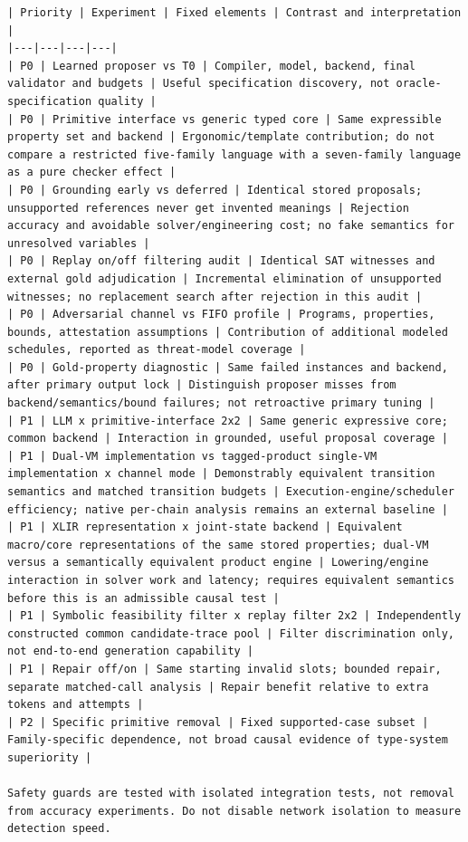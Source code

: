 \documentclass[11pt,a4paper]{article}
\begin{document}
\begin{verbatim}
| Priority | Experiment | Fixed elements | Contrast and interpretation |
|---|---|---|---|
| P0 | Learned proposer vs T0 | Compiler, model, backend, final validator and budgets | Useful specification discovery, not oracle-specification quality |
| P0 | Primitive interface vs generic typed core | Same expressible property set and backend | Ergonomic/template contribution; do not compare a restricted five-family language with a seven-family language as a pure checker effect |
| P0 | Grounding early vs deferred | Identical stored proposals; unsupported references never get invented meanings | Rejection accuracy and avoidable solver/engineering cost; no fake semantics for unresolved variables |
| P0 | Replay on/off filtering audit | Identical SAT witnesses and external gold adjudication | Incremental elimination of unsupported witnesses; no replacement search after rejection in this audit |
| P0 | Adversarial channel vs FIFO profile | Programs, properties, bounds, attestation assumptions | Contribution of additional modeled schedules, reported as threat-model coverage |
| P0 | Gold-property diagnostic | Same failed instances and backend, after primary output lock | Distinguish proposer misses from backend/semantics/bound failures; not retroactive primary tuning |
| P1 | LLM x primitive-interface 2x2 | Same generic expressive core; common backend | Interaction in grounded, useful proposal coverage |
| P1 | Dual-VM implementation vs tagged-product single-VM implementation x channel mode | Demonstrably equivalent transition semantics and matched transition budgets | Execution-engine/scheduler efficiency; native per-chain analysis remains an external baseline |
| P1 | XLIR representation x joint-state backend | Equivalent macro/core representations of the same stored properties; dual-VM versus a semantically equivalent product engine | Lowering/engine interaction in solver work and latency; requires equivalent semantics before this is an admissible causal test |
| P1 | Symbolic feasibility filter x replay filter 2x2 | Independently constructed common candidate-trace pool | Filter discrimination only, not end-to-end generation capability |
| P1 | Repair off/on | Same starting invalid slots; bounded repair, separate matched-call analysis | Repair benefit relative to extra tokens and attempts |
| P2 | Specific primitive removal | Fixed supported-case subset | Family-specific dependence, not broad causal evidence of type-system superiority |

Safety guards are tested with isolated integration tests, not removal from accuracy experiments. Do not disable network isolation to measure detection speed.


\end{verbatim}
\end{document}
